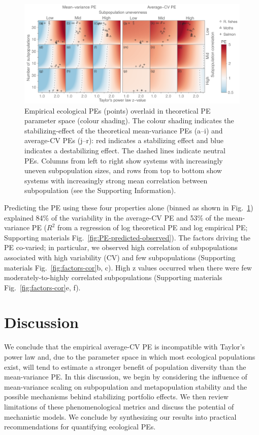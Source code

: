 \begin{figure}[htbp]
  \centering
  \includegraphics[width=\textwidth]{prophets/fig5}
  \caption[Empirical ecological PEs overlaid in theoretical PE
    parameter space.]{
  Empirical ecological PEs (points) overlaid in theoretical PE
    parameter space (colour shading). The colour shading indicates the
    stabilizing-effect of the theoretical mean-variance PEs (a--i) and
    average-CV PEs (j--r): red indicates a stabilizing effect and blue indicates
    a destabilizing effect.
    The dashed lines indicate neutral PEs. Columns from left to right
    show systems with increasingly uneven subpopulation sizes,
    and rows from top to bottom show systems with increasingly strong mean
    correlation between subpopulation (see the Supporting
    Information).
  } \label{fig:paramspace}
\end{figure}


Predicting the PE using these four properties alone (binned as shown in
Fig.~\ref{fig:paramspace}) explained
84\% of the variability in the average-CV PE and
53\% of the mean-variance PE ($R^2$ from a regression
of log theoretical PE and log empirical PE;
Supporting materials Fig.~\ref{fig:PE-predicted-observed}). The factors driving the PE co-varied; in
particular, we observed high correlation of subpopulations associated with high
variability (CV) and few subpopulations (Supporting materials Fig.~\ref{fig:factors-cor}b, c). High z
values occurred when there were few moderately-to-highly correlated
subpopulations (Supporting materials Fig.~\ref{fig:factors-cor}e, f).

\section{Discussion}

We conclude that the empirical average-CV PE is incompatible with Taylor's power
law and, due to the parameter space in which most ecological populations exist,
will tend to estimate a stronger benefit of population diversity than the
mean-variance PE. In this discussion, we begin by considering the influence of
mean-variance scaling on subpopulation and metapopulation stability and the
possible mechanisms behind stabilizing portfolio effects.
We then review limitations of these phenomenological metrics and discuss the
potential of mechanistic models. We conclude by synthesizing our results into
practical recommendations for quantifying ecological PEs.

